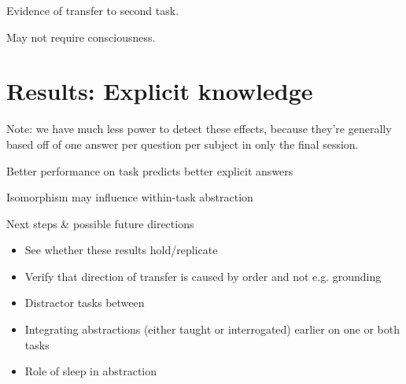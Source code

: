 \documentclass{beamer}
\begin{document}
\begin{frame}[standout]
Evidence of transfer to second task. \par
{} {
May not require consciousness.
}
\end{frame}
\section{Results: Explicit knowledge}


\begin{frame}
Note: we have much less power to detect these effects, because they're generally based off of one answer per question per subject in only the final session.
\end{frame}

\begin{frame}{Better performance on task predicts better explicit answers}
\begin{figure}
\centering
{} 
\end{figure}
\end{frame}


\begin{frame}{Isomorphism may influence within-task abstraction}
\begin{figure}
\centering
{} 

\end{figure}
\end{frame}

\begin{frame}{Next steps \& possible future directions}
\begin{itemize}
\item See whether these results hold/replicate 
\item<2-> Verify that direction of transfer is caused by order and not e.g. grounding
\item<3-> Distractor tasks between
\item<4-> Integrating abstractions (either taught or interrogated) earlier on one or both tasks
\item<5-> Role of sleep in abstraction
\end{itemize}
\end{frame}
\end{document}
